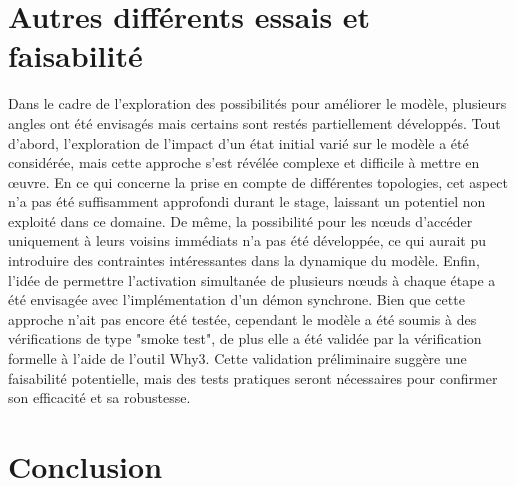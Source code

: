 \documentclass[11pt]{article}
\begin{document}
\section{Autres différents essais et faisabilité}
\label{sec:org724ae67}
Dans le cadre de l'exploration des possibilités pour améliorer le modèle, 
plusieurs angles ont été envisagés mais certains sont restés partiellement développés. 
Tout d'abord, l'exploration de l'impact d'un état initial varié sur le modèle a été considérée, 
mais cette approche s'est révélée complexe et difficile à mettre en œuvre. 
En ce qui concerne la prise en compte de différentes topologies, 
cet aspect n'a pas été suffisamment approfondi durant le stage, laissant un potentiel non exploité dans ce domaine. 
De même, la possibilité pour les nœuds d'accéder uniquement à leurs voisins immédiats n'a pas été développée, 
ce qui aurait pu introduire des contraintes intéressantes dans la dynamique du modèle. 
Enfin, l'idée de permettre l'activation simultanée de plusieurs nœuds à chaque étape a été envisagée avec l'implémentation d'un démon synchrone. 
Bien que cette approche n'ait pas encore été testée, cependant le modèle a été soumis à des vérifications de type "smoke test", 
de plus elle a été validée par la vérification formelle à l'aide de l'outil Why3. 
Cette validation préliminaire suggère une faisabilité potentielle, mais des tests pratiques seront nécessaires pour confirmer son efficacité et sa robustesse.


\section{Conclusion}
\label{sec:org2df66b5}
\end{document}
